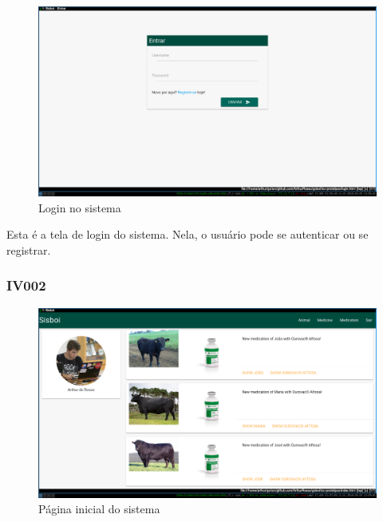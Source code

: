 \documentclass[12pt]{article}
\begin{document}
	\begin{figure}[!h]
		\begin{center}
			\caption{Login no sistema}
			\includegraphics[width=13cm]{img/prototipos/login.png}


		\end{center}
	\end{figure}
    
    Esta é a tela de login do sistema. Nela, o usuário pode se autenticar ou se registrar.


	\subsubsection{IV002}

	\begin{figure}[!h]
		\begin{center}
			\caption{Página inicial do sistema}
			\includegraphics[width=13cm]{img/prototipos/index.png}


		\end{center}
	\end{figure}
    
\end{document}
